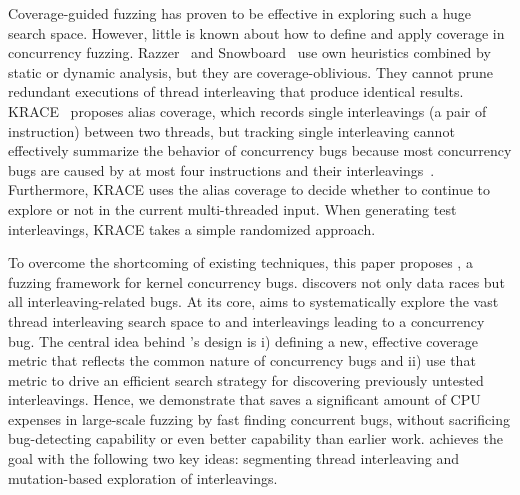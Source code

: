 

Coverage-guided fuzzing has proven to be effective in exploring such a huge search space.
However, little is known about how to define and apply coverage in concurrency fuzzing.
Razzer~\cite{razzer} and Snowboard~\cite{snowboard} use own heuristics
combined by static or dynamic analysis, but they are coverage-oblivious.
They cannot prune redundant executions of thread interleaving
that produce identical results. 
KRACE~\cite{krace} proposes alias coverage, which records 
single interleavings (a pair of instruction) between two threads, but tracking 
single interleaving cannot effectively summarize the behavior 
of concurrency bugs because
most concurrency bugs are caused by at most four instructions and their
interleavings~\cite{learningfrommistakes}.
Furthermore, KRACE uses 
the alias coverage to decide whether to continue to explore or not 
in the current multi-threaded input. When generating test interleavings,
KRACE takes a simple randomized approach.

To overcome the shortcoming of existing techniques, this paper proposes
\sys, a fuzzing framework for kernel concurrency bugs. 
\sys discovers not only data races but 
all interleaving-related bugs. 
At its core, \sys aims to systematically explore the vast thread
interleaving search space to  and 
interleavings leading to a concurrency bug. The central idea behind \sys's design
is i) defining a new, effective coverage metric that reflects the 
common nature of concurrency bugs and ii) use that metric to drive 
an efficient search strategy for discovering previously untested interleavings.
Hence, we demonstrate that \sys saves a significant amount of CPU expenses 
in large-scale fuzzing by fast finding concurrent bugs, 
without sacrificing bug-detecting capability or even better 
capability than earlier work.
\sys achieves the goal with the following two key ideas:
segmenting thread interleaving and mutation-based exploration of interleavings.

